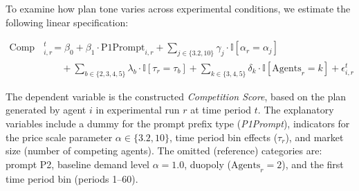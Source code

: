 To examine how plan tone varies across experimental conditions, we estimate the following linear specification:


\begin{equation}\label{eq:comp_score}
\begin{aligned}
    \text{Comp Score}^t_{i,r} &= \beta_0 + \beta_1 \cdot \text{P1Prompt}_{i,r} 
    + \sum_{j \in \{3.2, 10\}} \gamma_j \cdot \mathbb{I}[\alpha_r = \alpha_j] \\
    &\quad + \sum_{b \in \{2, 3, 4, 5\}} \lambda_b \cdot \mathbb{I}[\tau_r = \tau_b] 
    + \sum_{k \in \{3, 4, 5\}} \delta_k \cdot \mathbb{I}[\text{Agents}_r = k] 
    + \epsilon_{i,r}^t
\end{aligned}
\end{equation}


The dependent variable is the constructed \textit{Competition Score}, based on the plan generated by agent $i$ in experimental run $r$ at time period $t$. The explanatory variables include a dummy for the prompt prefix type (\textit{P1Prompt}), indicators for the price scale parameter $\alpha \in \{3.2, 10\}$, time period bin effects ($\tau_r$), and market size (number of competing agents). The omitted (reference) categories are: prompt P2, baseline demand level $\alpha = 1.0$, duopoly ($\text{Agents}_r = 2$), and the first time period bin (periods 1–60).

